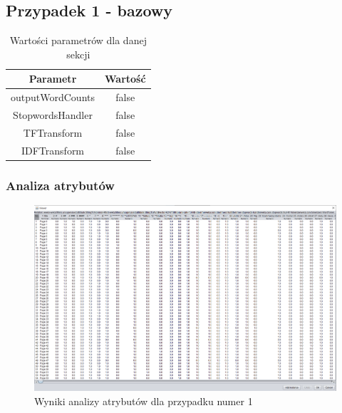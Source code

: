\documentclass[../EDI_Task2_Karwowski_Kowalewski.tex]{subfiles}
\begin{document}
 {

    \subsection{Przypadek 1 - bazowy} {

        \begin{table}[!htbp]
            \small
            \centering
            \begin{tabular}{|c|c|}
                \hline
                Parametr & Wartość \\ \hline
                outputWordCounts & false \\ \hline
                StopwordsHandler & false \\ \hline
                TFTransform & false \\ \hline
                IDFTransform & false \\ \hline
            \end{tabular}
            \caption{Wartości parametrów dla danej sekcji}
        \end{table}
        \FloatBarrier

        \subsubsection{Analiza atrybutów} {

            \begin{figure}[!htbp]
                \centering
                \includegraphics[width=\textwidth]{img/results2/weeia-case1.png}
                \caption{Wyniki analizy atrybutów dla przypadku numer 1}
            \end{figure}
            \FloatBarrier
        }

}}
\end{document}
